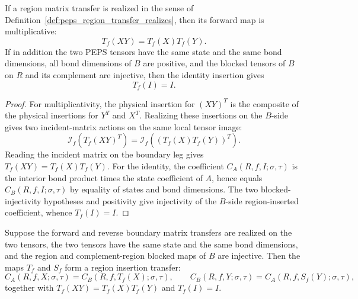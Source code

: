 \begin{theorem}
    \label{thm:peps_region_transfer_realized_maps}
    \leanok
    If a region matrix transfer is realized in the sense of
    Definition~\ref{def:peps_region_transfer_realizes}, then its forward map is
    multiplicative:
    \[
        T_f(XY)=T_f(X)T_f(Y).
    \]
    If in addition the two PEPS tensors have the same state and the same bond
    dimensions, all bond dimensions of $B$ are positive, and the blocked
    tensors of $B$ on $R$ and its complement are injective, then the identity
    insertion gives
    \[
        T_f(I)=I.
    \]
\end{theorem}
\begin{proof}\leanok
    For multiplicativity, the physical insertion for $(XY)^T$ is the composite
    of the physical insertions for $Y^T$ and $X^T$.  Realizing these insertions
    on the $B$-side gives two incident-matrix actions on the same local tensor
    image:
    \[
        \mathcal I_f(T_f(XY)^T)
        =
        \mathcal I_f((T_f(X)T_f(Y))^T).
    \]
    Reading the incident matrix on the boundary leg gives
    $T_f(XY)=T_f(X)T_f(Y)$.  For the identity, the coefficient
    $C_A(R,f,I;\sigma,\tau)$ is the interior bond product times the state
    coefficient of $A$, hence equals $C_B(R,f,I;\sigma,\tau)$ by equality of
    states and bond dimensions.  The two blocked-injectivity hypotheses and
    positivity give injectivity of the $B$-side region-inserted coefficient,
    whence $T_f(I)=I$.
\end{proof}

\begin{definition}
    \label{def:peps_region_insertion_transfer_of_realizes}
    \leanok
    Suppose the forward and reverse boundary matrix transfers are realized on
    the two tensors, the two tensors have the same state and the same bond
    dimensions, and the region and complement-region blocked maps of $B$ are
    injective.
    Then the maps $T_f$ and $S_f$ form a region insertion transfer:
    \[
        C_A(R,f,X;\sigma,\tau)
        =
        C_B(R,f,T_f(X);\sigma,\tau),
        \qquad
        C_B(R,f,Y;\sigma,\tau)
        =
        C_A(R,f,S_f(Y);\sigma,\tau),
    \]
    together with $T_f(XY)=T_f(X)T_f(Y)$ and $T_f(I)=I$.
\end{definition}

